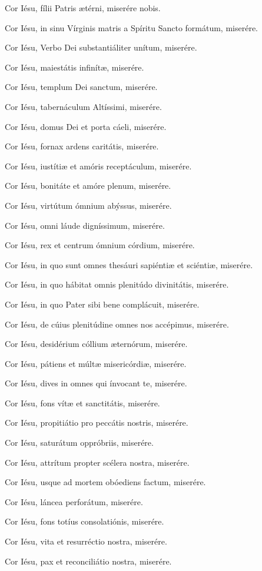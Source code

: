 \documentclass[12pt,a6paper]{book}
\begin{document}
\begin{sloppy}
Cor Iésu, fílii Patris ætérni, miserére nobis.

Cor Iésu, in sinu Vírginis matris a Spíritu Sancto formátum, miserére.

Cor Iésu, Verbo Dei substantiáliter unítum, miserére.

Cor Iésu, maiestátis infinítæ, miserére.

Cor Iésu, templum Dei sanctum, miserére.

Cor Iésu, tabernáculum Altíssimi, miserére.

Cor Iésu, domus Dei et porta cáeli, miserére.

Cor Iésu, fornax ardens caritátis, miserére.

Cor Iésu, iustítiæ et amóris receptáculum, miserére.

Cor Iésu, bonitáte et amóre plenum, miserére.

Cor Iésu, virtútum ómnium abýssus, miserére.

Cor Iésu, omni láude digníssimum, miserére.

Cor Iésu, rex et centrum ómnium córdium, miserére.

Cor Iésu, in quo sunt omnes thesáuri sapiéntiæ et sciéntiæ, miserére.

Cor Iésu, in quo hábitat omnis plenitúdo divinitátis, miserére.

Cor Iésu, in quo Pater sibi bene complácuit, miserére.

Cor Iésu, de cúius plenitúdine omnes nos accépimus, miserére.

Cor Iésu, desidérium cóllium æternórum, miserére.

Cor Iésu, pátiens et múltæ misericórdiæ, miserére.

Cor Iésu, dives in omnes qui ínvocant te, miserére.

Cor Iésu, fons vítæ et sanctitátis, miserére.

Cor Iésu, propitiátio pro peccátis nostris, miserére.

Cor Iésu, saturátum oppróbriis, miserére.

Cor Iésu, attrítum propter scélera nostra, miserére.

Cor Iésu, usque ad mortem obóediens factum, miserére.

Cor Iésu, láncea perforátum, miserére.

Cor Iésu, fons totíus consolatiónis, miserére.

Cor Iésu, vita et resurréctio nostra, miserére.

Cor Iésu, pax et reconciliátio nostra, miserére.


\end{sloppy}
\end{document}
